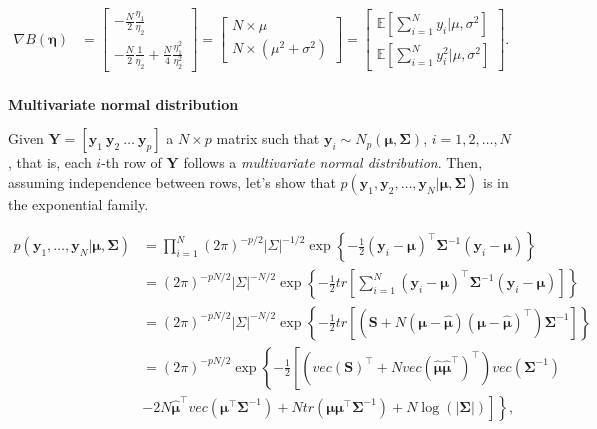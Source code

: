 \begin{enumerate}
\begin{align*}
	\nabla B(\bm{\eta}) & = \begin{bmatrix}
		-\frac{N}{2}\frac{\eta_1}{\eta_2}\\
		-\frac{N}{2}\frac{1}{\eta_2}+\frac{N}{4}\frac{\eta_1^2}{\eta_2^2}
	\end{bmatrix}
	=
	\begin{bmatrix}
		N\times\mu\\
		N\times(\mu^2+\sigma^2)
	\end{bmatrix}  = \begin{bmatrix}
		\mathbb{E}\left[\sum_{i=1}^N y_i\bigr\rvert \mu,\sigma^2\right]\\
		\mathbb{E}\left[\sum_{i=1}^N y_i^2\bigr\rvert \mu,\sigma^2\right]
	\end{bmatrix}. 
\end{align*}
\\

\textbf{Multivariate normal distribution}

Given $\bm{Y}=[\bm{y}_1 \ \bm{y}_2 \ \dots \ \bm{y}_p]$ a $N\times p$ matrix such that $\bm{y}_i\sim N_p(\bm{\mu},\bm{\Sigma})$, $i=1,2,\dots,N$, that is, each $i$-th row of $\bm{Y}$ follows a \textit{multivariate normal distribution}. Then, assuming independence between rows, let's show that $p(\bm{y}_1,\bm{y}_2,\dots,\bm{y}_N|\bm{\mu},\bm{\Sigma})$ is in the exponential family.

{\footnotesize{
\begin{align}
	p(\bm{y}_1,\dots,\bm{y}_N|\bm{\mu},\bm{\Sigma})&=\prod_{i=1}^N (2\pi)^{-p/2}|\Sigma|^{-1/2}\exp\left\{-\frac{1}{2}\left(\bm{y}_i-\bm{\mu}\right)^{\top}\bm{\Sigma}^{-1}\left(\bm{y}_i-\bm{\mu}\right)\right\}\nonumber\\
	&= (2\pi)^{-pN/2}|\Sigma|^{-N/2}\exp\left\{-\frac{1}{2}tr\left[\sum_{i=1}^N\left(\bm{y}_i-\bm{\mu}\right)^{\top}\bm{\Sigma}^{-1}\left(\bm{y}_i-\bm{\mu}\right)\right]\right\}\nonumber\\
	&= (2\pi)^{-p N/2}|\Sigma|^{-N/2}\exp\left\{-\frac{1}{2}tr\left[\left(\bm{S}+N\left(\bm{\mu}-\hat{\bm{\mu}}\right)\left(\bm{\mu}-\hat{\bm{\mu}}\right)^{\top}\right)\bm{\Sigma}^{-1}\right]\right\}\nonumber\\
	&= (2\pi)^{-p N/2}\exp\left\{-\frac{1}{2}\left[\left(vec\left(\bm{S}\right)^{\top}+N vec\left(\hat{\bm{\mu}}\hat{\bm{\mu}}^{\top}\right)^{\top}\right)vec \left(\bm{\Sigma}^{-1}\right)\right.\right.\nonumber\\
	&\left.\left.-2N\hat{\bm{\mu}}^{\top}vec\left(\bm{\mu}^{\top}\bm{\Sigma}^{-1}\right)+N tr\left(\bm{\mu}\bm{\mu}^{\top}\bm{\Sigma}^{-1}\right)+N\log (|\bm{\Sigma}|)\right]\right\}\nonumber,
\end{align}
}}


\end{enumerate}
